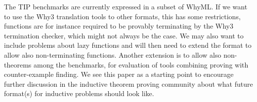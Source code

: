 \documentclass{llncs}
\begin{document}
The TIP benchmarks are currently expressed in a subset of WhyML. If we want to use the Why3 translation tools to other formats, this has some restrictions, functions are for instance required to be provably terminating by the Why3 termination checker, which might not always be the case. We may also want to include problems about lazy functions and will then need to extend the format to allow also non-terminating functions.  
Another extension is to allow also non-theorems among the benchmarks, for evaluation of tools combining proving with counter-example finding.  We see this paper as a starting point to encourage further discussion in the inductive theorem proving community about what future format(s) for inductive problems should look like.





\end{document}
